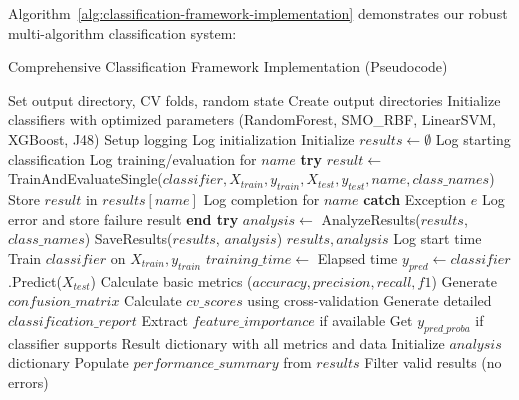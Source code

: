 Algorithm~\ref{alg:classification-framework-implementation} demonstrates our robust multi-algorithm classification system:

\begin{algorithm}[!htbp]
\caption{Comprehensive Classification Framework Implementation (Pseudocode)}
\label{alg:classification-framework-implementation}
\begin{algorithmic}[1]
    \State Set output directory, CV folds, random state
    \State Create output directories
    \State Initialize classifiers with optimized parameters (RandomForest, SMO\_RBF, LinearSVM, XGBoost, J48)
    \State Setup logging
    \State Log initialization
\EndProcedure
\Statex
{}
    \State Initialize $results \leftarrow \emptyset$
    \State Log starting classification
        \State Log training/evaluation for $name$
        \State \textbf{try}
            \State $result \leftarrow$ TrainAndEvaluateSingle($classifier, X_{train}, y_{train}, X_{test}, y_{test}, name, class\_names$)
            \State Store $result$ in $results[name]$
            \State Log completion for $name$
        \State \textbf{catch} {Exception $e$}
            \State Log error and store failure result
        \State \textbf{end try}
    \EndFor
    \State $analysis \leftarrow$ AnalyzeResults($results$, $class\_names$)
    \State SaveResults($results$, $analysis$)
    \Return $results, analysis$
\EndProcedure
\Statex
{}
    \State Log start time
    \State Train $classifier$ on $X_{train}, y_{train}$
    \State $training\_time \leftarrow$ Elapsed time
    \State $y_{pred} \leftarrow classifier$.Predict($X_{test}$)
    \State Calculate basic metrics ($accuracy, precision, recall, f1$)
    \State Generate $confusion\_matrix$
    \State Calculate $cv\_scores$ using cross-validation
    \State Generate detailed $classification\_report$
    \State Extract $feature\_importance$ if available
    \State Get $y_{pred\_proba}$ if classifier supports
    \Return Result dictionary with all metrics and data
\EndProcedure
\Statex
{}
    \State Initialize $analysis$ dictionary
    \State Populate $performance\_summary$ from $results$
    \State Filter valid results (no errors)

\end{algorithmic}
\end{algorithm}
